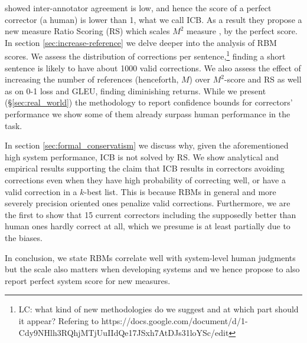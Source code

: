 \documentclass[a4paper, 11pt]{article}
\newcommand{\lc}[1]{\footnote{\color{blue}LC: #1}}
\begin{document}
	\citet{bryant2015far} showed inter-annotator agreement is low, and hence the score of a perfect corrector (a human) is lower than 1, what we call ICB. As a result they propose a new measure Ratio Scoring (RS) which scales $M^2$ measure \cite{dahlmeier2012better}, by the perfect score. In section \ref{sec:increase-reference} we delve deeper into the analysis of RBM scores. We assess the distribution of corrections per sentence,\lc{what kind of new methodologies do we suggest and at which part should it appear? Refering to https://docs.google.com/document/d/1-Cdy9NHlh3RQhjMTjUuIIdQe17JSxh7AtDJs31loYSc/edit} finding a short sentence is likely to have about 1000 valid corrections. We also assess the effect of increasing the number of references (henceforth, $M$) over $M^2$-score and RS as well as on 0-1 loss and GLEU, finding diminishing returns. While we present (\S \ref{sec:real_world}) the methodology to report confidence bounds for correctors' performance we show some of them already surpass human performance in the task.
	
	In section \ref{sec:formal_conservatism} we discuss why, given the aforementioned high system performance, ICB is not solved by RS. We show analytical and empirical results supporting the claim that ICB results in correctors avoiding corrections even when they have high probability of correcting well, or have a valid correction in a $k$-best list. This is because RBMs in general and more severely precision oriented ones penalize valid corrections. Furthermore, we are the first to show that 15 current correctors including the supposedly better than human ones hardly correct at all, which we presume is at least partially due to the biases.
	
	In conclusion, we state RBMs correlate well with system-level human judgments \cite{napoles-sakaguchi-tetreault:2016:EMNLP2016} but the scale also matters when developing systems and we hence propose to also report perfect system score for new measures.

\end{document}
